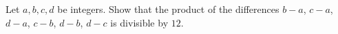Let $a, b, c, d$ be integers. Show that the product of the differences $b - a$, $c - a$, $d - a$, $c - b$, $d - b$, $d - c$ is divisible by $12$.
